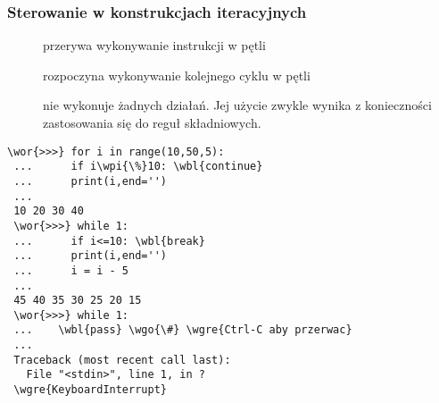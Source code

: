 \begin{frame}[fragile]
\frametitle{Sterowanie w konstrukcjach iteracyjnych}
\begin{minipage}[t]{.45\textwidth}\vspace{0pt}\small

 \begin{description}
 \item[] przerywa wykonywanie instrukcji w pętli
 \item[] rozpoczyna wykonywanie kolejnego cyklu w pętli

 \item[] nie wykonuje żadnych działań. Jej użycie zwykle
 wynika z konieczności zastosowania się do reguł składniowych.
 \end{description}
\end{minipage}\hspace{.02\textwidth}%
\begin{minipage}[t]{.52\textwidth}\vspace{0pt}

 \begin{Verbatim}[fontsize=\scriptsize,codes={\catcode`$=3\catcode`^=7},
                 frame=single,framesep=3mm,commandchars=\\\{\},gobble=1]
 \wor{>>>} for i in range(10,50,5):
 ...      if i\wpi{\%}10: \wbl{continue}
 ...      print(i,end='')
 ...
 10 20 30 40
 \wor{>>>} while 1:
 ...      if i<=10: \wbl{break}
 ...      print(i,end='')
 ...      i = i - 5
 ...
 45 40 35 30 25 20 15
 \wor{>>>} while 1:
 ...    \wbl{pass} \wgo{\#} \wgre{Ctrl-C aby przerwac}
 ...
 Traceback (most recent call last):
   File "<stdin>", line 1, in ?
 \wgre{KeyboardInterrupt}
 \end{Verbatim}

\end{minipage}
\end{frame}

